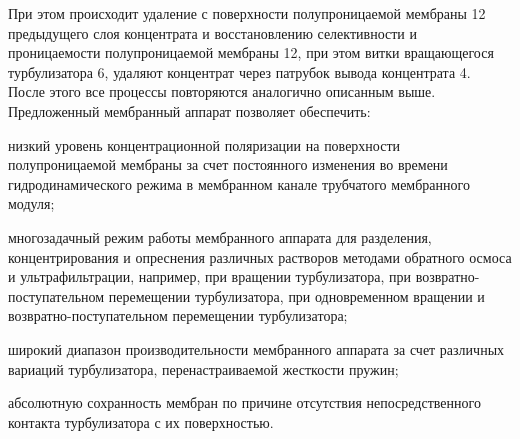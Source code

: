 При этом происходит удаление с поверхности полупроницаемой мембраны 12 предыдущего слоя концентрата и восстановлению селективности и проницаемости полупроницаемой мембраны 12, при этом витки вращающегося турбулизатора 6, удаляют концентрат через патрубок вывода концентрата 4.
После этого все процессы повторяются аналогично описанным выше.
Предложенный мембранный аппарат позволяет обеспечить:

низкий уровень концентрационной поляризации на поверхности полупроницаемой мембраны за счет постоянного изменения во времени гидродинамического режима в мембранном канале трубчатого мембранного модуля;

многозадачный режим работы мембранного аппарата для разделения, концентрирования и опреснения различных растворов методами обратного осмоса и ультрафильтрации, например, при вращении турбулизатора, при возвратно-поступательном перемещении турбулизатора, при одновременном вращении и возвратно-поступательном перемещении турбулизатора;

широкий диапазон производительности мембранного аппарата за счет различных вариаций турбулизатора, перенастраиваемой жесткости пружин;

абсолютную сохранность мембран по причине отсутствия непосредственного контакта турбулизатора с их поверхностью.

